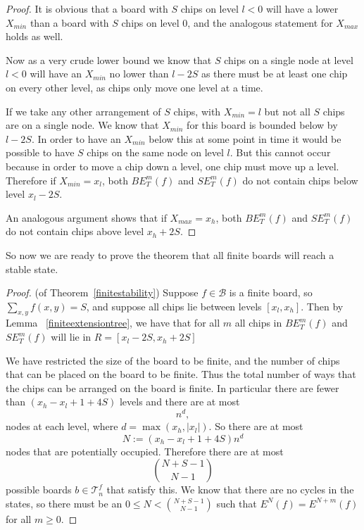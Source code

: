\documentclass[11pt]{article}
\begin{document}
\begin{proof}
It is obvious that a board with $S$ chips on level $l<0$ will have a lower $X_{min}$ than a board with $S$ chips on level 0, and the analogous statement for $X_{max}$ holds as well. 

Now as a very crude lower bound we know that $S$ chips on a single node at level $l<0$ will have an $X_{min}$ no lower than $l-2S$ as there must be at least one chip on every other level, as chips only move one level at a time. 

If we take any other arrangement of $S$ chips, with $X_{min}=l$ but not all $S$ chips are on a single node. We know that $X_{min}$ for this board is bounded below by $l-2S$. In order to have an $X_{min}$ below this at some point in time it would be possible to have $S$ chips on the same node on level $l$. But this cannot occur because in order to move a chip down a level, one chip must move up a level. Therefore if $X_{min}=x_l$, both $BE_T^m(f)$ and $SE_T^m(f)$ do not contain chips below level $x_l -2S$.

An analogous argument shows that if $X_{max}=x_h$, both $BE_T^m(f)$ and $SE_T^m(f)$ do not contain chips above level $x_h+2S$.
\end{proof}

So now we are ready to prove the theorem that all finite boards will reach a stable state. 

\begin{proof}
(of Theorem~\ref{finitestability}) Suppose $f \in \mathcal{B}$ is a finite board, so $\sum_{x,y} f(x,y) = S$, and suppose all chips lie between levels  $[x_l, x_h]$. Then by Lemma ~\ref{finiteextensiontree}, we have that for all $m$ all chips in $BE_T^m(f)$ and $SE_T^m(f)$ will lie in $R = [x_l - 2S, x_h + 2S]$

We have restricted the size of the board to be finite, and the number of chips that can be placed on the board to be finite. 
Thus the total number of ways that the chips can be arranged on the board is finite. 
In particular there are fewer than $(x_h - x_l+1 + 4 S)$ levels and there are at most 
\begin{equation}
n^d,
\end{equation}
nodes at each level, where $d= \max(x_h, |x_l|)$. So there are at most 
\begin{equation}
N:=(x_h - x_l+1 + 4 S)n^d
\end{equation}
nodes that are potentially occupied. Therefore there are at most 
\begin{equation}
\binom{N+S-1}{N-1}
\end{equation}
possible boards $b \in \mathcal{T}_n^f$ that satisfy this. We know that there are no cycles in the states, so there must be an $0 \leq N < \binom{N+S-1}{N-1}$ such that $E^N(f) = E^{N+m}(f)$ for all $m \geq 0$.
\end{proof}
\end{document}
